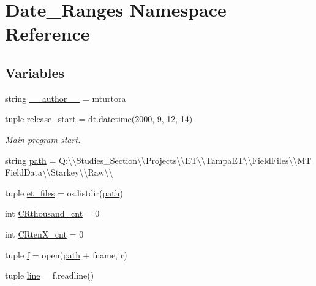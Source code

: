 \hypertarget{namespace_date___ranges}{}\section{Date\+\_\+\+Ranges Namespace Reference}
\label{namespace_date___ranges}
\subsection*{Variables}
\begin{DoxyCompactItemize}
\item 
string \hyperlink{namespace_date___ranges_a74443da5ab7e30b6f0df595d9193852e}{\+\_\+\+\_\+author\+\_\+\+\_\+} = \textquotesingle{}mturtora\textquotesingle{}
\item 
tuple \hyperlink{namespace_date___ranges_a3166246a888c28029ade73f791a9a47b}{release\+\_\+start} = dt.\+datetime(2000, 9, 12, 14)
\begin{DoxyCompactList}\small\item\em Main program start. \end{DoxyCompactList}\item 
string \hyperlink{namespace_date___ranges_aa526c3131e65944170a04293caf94a27}{path} = \textquotesingle{}Q\+:\textbackslash{}\textbackslash{}\+Studies\+\_\+\+Section\textbackslash{}\textbackslash{}\+Projects\textbackslash{}\textbackslash{}\+E\+T\textbackslash{}\textbackslash{}\+Tampa\+E\+T\textbackslash{}\textbackslash{}\+Field\+Files\textbackslash{}\textbackslash{}\+M\+T Field\+Data\textbackslash{}\textbackslash{}\+Starkey\textbackslash{}\textbackslash{}\+Raw\textbackslash{}\textbackslash{}\textquotesingle{}
\item 
tuple \hyperlink{namespace_date___ranges_adee3fa20a1eb91e33335d0ab5b4c98c1}{et\+\_\+files} = os.\+listdir(\hyperlink{namespace_date___ranges_aa526c3131e65944170a04293caf94a27}{path})
\item 
int \hyperlink{namespace_date___ranges_a2415665778377c640e186f6bb947c2c6}{C\+Rthousand\+\_\+cnt} = 0
\item 
int \hyperlink{namespace_date___ranges_a343f0166e1218b0e3eeb2ab0f08cfea6}{C\+Rten\+X\+\_\+cnt} = 0
\item 
tuple \hyperlink{namespace_date___ranges_afc7dea9c3c3f747aa8fb116c9272c535}{f} = open(\hyperlink{namespace_date___ranges_aa526c3131e65944170a04293caf94a27}{path} + fname, \textquotesingle{}r\textquotesingle{})
\item 
tuple \hyperlink{namespace_date___ranges_a62b9a1723ddacde8e439cbd75285a050}{line} = f.\+readline()

\end{DoxyCompactItemize}

